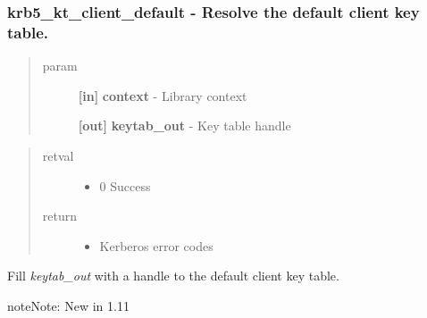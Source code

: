 \documentclass[letterpaper,10pt,english]{sphinxmanual}
\begin{document}
\subsubsection{krb5\_kt\_client\_default -  Resolve the default client key table.}
\label{appdev/refs/api/krb5_kt_client_default::doc}\label{appdev/refs/api/krb5_kt_client_default:krb5-kt-client-default-resolve-the-default-client-key-table}

\begin{fulllineitems}
\label{appdev/refs/api/krb5_kt_client_default:c.krb5_kt_client_default}
\end{fulllineitems}

\begin{quote}\begin{description}
\item[{param}] \leavevmode
\textbf{{[}in{]}} \textbf{context} - Library context

\textbf{{[}out{]}} \textbf{keytab\_out} - Key table handle

\end{description}\end{quote}
\begin{quote}\begin{description}
\item[{retval}] \leavevmode\begin{itemize}
\item {} 
0   Success

\end{itemize}

\item[{return}] \leavevmode\begin{itemize}
\item {} 
Kerberos error codes

\end{itemize}

\end{description}\end{quote}

Fill \emph{keytab\_out} with a handle to the default client key table.

\begin{notice}{note}{Note:}
New in 1.11
\end{notice}
\end{document}
